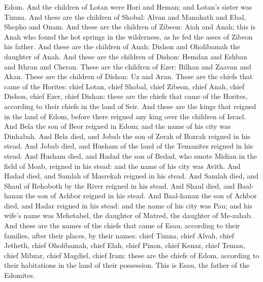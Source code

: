 Edom. And the children of Lotan were Hori and Heman; and Lotan’s sister was Timna. And these are the children of Shobal: Alvan and Manahath and Ebal, Shepho and Onam. And these are the children of Zibeon: Aiah and Anah; this is Anah who found the hot springs in the wilderness, as he fed the asses of Zibeon his father. And these are the children of Anah: Dishon and Oholibamah the daughter of Anah. And these are the children of Dishon: Hemdan and Eshban and Ithran and Cheran. These are the children of Ezer: Bilhan and Zaavan and Akan. These are the children of Dishan: Uz and Aran. These are the chiefs that came of the Horites: chief Lotan, chief Shobal, chief Zibeon, chief Anah, chief Dishon, chief Ezer, chief Dishan: these are the chiefs that came of the Horites, according to their chiefs in the land of Seir.  And these are the kings that reigned in the land of Edom, before there reigned any king over the children of Israel. And Bela the son of Beor reigned in Edom; and the name of his city was Dinhabah. And Bela died, and Jobab the son of Zerah of Bozrah reigned in his stead. And Jobab died, and Husham of the land of the Temanites reigned in his stead. And Husham died, and Hadad the son of Bedad, who smote Midian in the field of Moab, reigned in his stead: and the name of his city was Avith. And Hadad died, and Samlah of Masrekah reigned in his stead. And Samlah died, and Shaul of Rehoboth by the River reigned in his stead. And Shaul died, and Baal-hanan the son of Achbor reigned in his stead. And Baal-hanan the son of Achbor died, and Hadar reigned in his stead: and the name of his city was Pau; and his wife’s name was Mehetabel, the daughter of Matred, the daughter of Me-zahab.  And these are the names of the chiefs that came of Esau, according to their families, after their places, by their names: chief Timna, chief Alvah, chief Jetheth, chief Oholibamah, chief Elah, chief Pinon, chief Kenaz, chief Teman, chief Mibzar, chief Magdiel, chief Iram: these are the chiefs of Edom, according to their habitations in the land of their possession. This is Esau, the father of the Edomites. 


